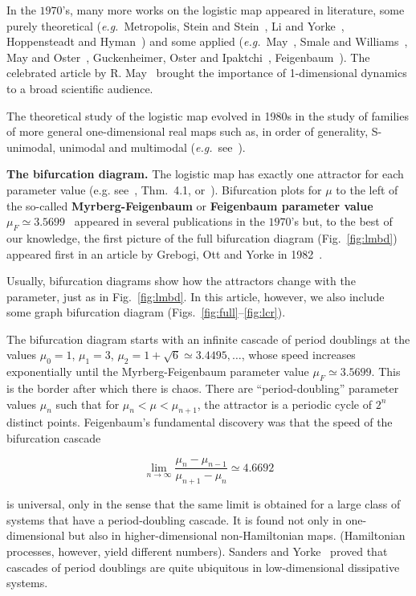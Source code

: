 \documentclass{article}
\newcommand{\jim}{\color{black} }
\newcommand{\eg}{{\it{e.g.}}}
\newcommand{\beq}{\begin{linenomath}\begin{equation}} %
\newcommand{\eeq}{\end{equation}\end{linenomath}} %
\begin{document}
In the $1970$'s, many more works on the logistic map appeared in literature, some purely theoretical  (\eg\ Metropolis, Stein and Stein~\cite{MSS73}, Li and Yorke~\cite{LY75}, Hoppensteadt and Hyman~\cite{Hop77}) and some applied (\eg\ May~\cite{May75}, Smale and Williams~\cite{SW76}, May and Oster~\cite{MO76}, Guckenheimer, Oster and Ipaktchi~\cite{GOI77}, Feigenbaum~\cite{Fei78}). 
The celebrated article by R. May~\cite{May76} brought the importance of 1-dimensional dynamics to a broad scientific audience.

The theoretical study of the logistic map evolved in 1980s in the study of families of more general one-dimensional real maps such as, in order of generality, S-unimodal, unimodal and multimodal (\eg~see~\cite{dMvS93,vSt10,Lyu12}).

{\bf The bifurcation diagram.}  The logistic map has exactly one attractor for each parameter value (e.g. see~\cite{dMvS93}, Thm.~4.1, or~\cite{Lyu12}). Bifurcation plots for $\mu$ to the left of the so-called {\bf Myrberg-Feigenbaum } or {\bf Feigenbaum  parameter value} $\mu_F\simeq3.5699$~\cite{Fei78} appeared in several publications in the $1970$'s but, to the best of our knowledge, the first picture of the full bifurcation diagram (Fig.~\ref{fig:lmbd}) appeared first in an article by Grebogi, Ott and Yorke in 1982~\cite{GOY82}.

Usually, bifurcation diagrams show how the attractors change with the parameter, just as in Fig.~\ref{fig:lmbd}. {\jim In this article, however, we also include some graph bifurcation diagram (Figs.~\ref{fig:full}--\ref{fig:lcr})}.

The bifurcation diagram starts with an infinite cascade of period doublings at the values $\mu_0=1$, $\mu_1=3$, $\mu_2=1+\sqrt{6} \simeq3.4495,\dots$, whose speed increases exponentially until the Myrberg-Feigenbaum parameter value $\mu_F\simeq3.5699$. 
This is the border after which there is chaos. There are ``period-doubling'' parameter values $\mu_n$ such that for $\mu_n<\mu<\mu_{n+1}$, the attractor is a periodic cycle of $2^n$ distinct points. Feigenbaum's fundamental discovery was  that the speed of the bifurcation cascade 
\beq
\lim_{n\to\infty}\frac{\mu_n-\mu_{n-1}}{\mu_{n+1}-\mu_n}\simeq4.6692
\eeq
is universal,  {\jim only in the sense that the same limit is obtained for a large class of systems that have a period-doubling cascade. It is found not only in one-dimensional but also in higher-dimensional non-Hamiltonian maps.} 
(Hamiltonian processes, however, yield different numbers).
Sanders and Yorke~\cite{SY13} proved that cascades of period doublings are quite ubiquitous in low-dimensional dissipative systems.  
\end{document}

